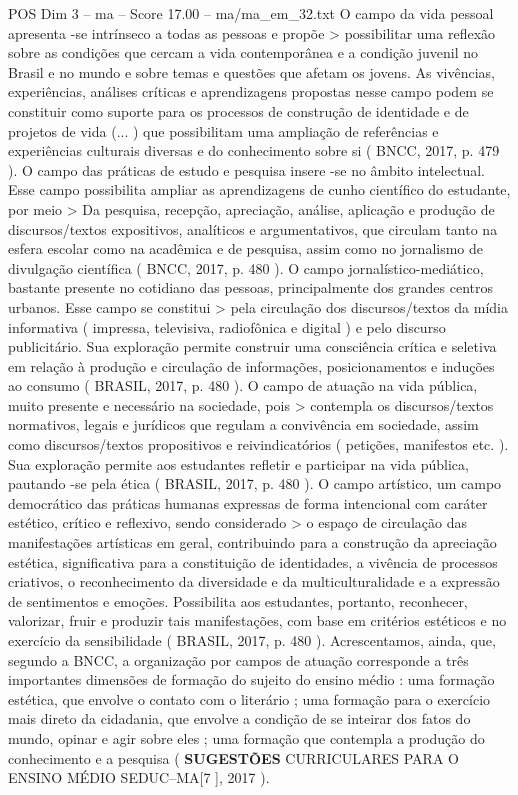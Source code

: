 \begin{textsample}{POS Dim 3 – ma – Score 17.00 – ma/ma\_em\_32.txt}
O campo da vida pessoal apresenta -se intrínseco a todas as pessoas e propõe > possibilitar uma reflexão sobre as condições que cercam a vida contemporânea e a condição juvenil no Brasil e no mundo e sobre temas e questões que afetam os jovens.
As vivências, experiências, análises críticas e aprendizagens propostas nesse campo podem se constituir como suporte para os processos de construção de identidade e de projetos de vida (... ) que possibilitam uma ampliação de referências e experiências culturais diversas e do conhecimento sobre si ( BNCC, 2017, p. 479 ).
O campo das práticas de estudo e pesquisa insere -se no âmbito intelectual.
Esse campo possibilita ampliar as aprendizagens de cunho científico do estudante, por meio > Da pesquisa, recepção, apreciação, análise, aplicação e produção de discursos/textos expositivos, analíticos e argumentativos, que circulam tanto na esfera escolar como na acadêmica e de pesquisa, assim como no jornalismo de divulgação científica ( BNCC, 2017, p. 480 ).
O campo jornalístico-mediático, bastante presente no cotidiano das pessoas, principalmente dos grandes centros urbanos.
Esse campo se constitui > pela circulação dos discursos/textos da mídia informativa ( impressa, televisiva, radiofônica e digital ) e pelo discurso publicitário.
Sua exploração permite construir uma consciência crítica e seletiva em relação à produção e circulação de informações, posicionamentos e induções ao consumo ( BRASIL, 2017, p. 480 ).
O campo de atuação na vida pública, muito presente e necessário na sociedade, pois > contempla os discursos/textos normativos, legais e jurídicos que regulam a convivência em sociedade, assim como discursos/textos propositivos e reivindicatórios ( petições, manifestos etc. ).
Sua exploração permite aos estudantes refletir e participar na vida pública, pautando -se pela ética ( BRASIL, 2017, p. 480 ).
O campo artístico, um campo democrático das práticas humanas expressas de forma intencional com caráter estético, crítico e reflexivo, sendo considerado > o espaço de circulação das manifestações artísticas em geral, contribuindo para a construção da apreciação estética, significativa para a constituição de identidades, a vivência de processos criativos, o reconhecimento da diversidade e da multiculturalidade e a expressão de sentimentos e emoções.
Possibilita aos estudantes, portanto, reconhecer, valorizar, fruir e produzir tais manifestações, com base em critérios estéticos e no exercício da sensibilidade ( BRASIL, 2017, p. 480 ).
Acrescentamos, ainda, que, segundo a BNCC, a organização por campos de atuação corresponde a três importantes dimensões de formação do sujeito do ensino médio : uma formação estética, que envolve o contato com o literário ; uma formação para o exercício mais direto da cidadania, que envolve a condição de se inteirar dos fatos do mundo, opinar e agir sobre eles ; uma formação que contempla a produção do conhecimento e a pesquisa ( \textbf{SUGESTÕES} CURRICULARES PARA O ENSINO MÉDIO SEDUC–MA[7 ], 2017 ).

\end{textsample}
